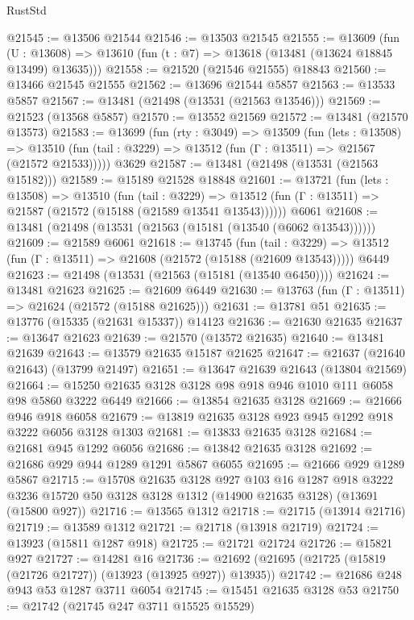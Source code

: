 \begin{lexlean}{RustStd}
\begin{coremodule}
@21545 := @13506 @21544
@21546 := @13503 @21545
@21555 := @13609
    (fun (U : @13608) => @13610 (fun (t : @7) => @13618 (@13481 (@13624 @18845 @13499) @13635)))
@21558 := @21520 (@21546 @21555) @18843
@21560 := @13466 @21545 @21555
@21562 := @13696 @21544 @5857
@21563 := @13533 @5857
@21567 := @13481 (@21498 (@13531 (@21563 @13546)))
@21569 := @21523 (@13568 @5857)
@21570 := @13552 @21569
@21572 := @13481 (@21570 @13573)
@21583 := @13699
    (fun (rty : @3049) =>
    @13509
      (fun (lets : @13508) =>
      @13510 (fun (tail : @3229) => @13512 (fun (Γ : @13511) => @21567 (@21572 @21533)))))
    @3629
@21587 := @13481 (@21498 (@13531 (@21563 @15182)))
@21589 := @15189 @21528 @18848
@21601 := @13721
    (fun (lets : @13508) =>
    @13510
      (fun (tail : @3229) =>
      @13512 (fun (Γ : @13511) => @21587 (@21572 (@15188 (@21589 @13541 @13543))))))
    @6061
@21608 := @13481 (@21498 (@13531 (@21563 (@15181 (@13540 (@6062 @13543))))))
@21609 := @21589 @6061
@21618 := @13745
    (fun (tail : @3229) => @13512 (fun (Γ : @13511) => @21608 (@21572 (@15188 (@21609 @13543)))))
    @6449
@21623 := @21498 (@13531 (@21563 (@15181 (@13540 @6450))))
@21624 := @13481 @21623
@21625 := @21609 @6449
@21630 := @13763 (fun (Γ : @13511) => @21624 (@21572 (@15188 @21625)))
@21631 := @13781 @51
@21635 := @13776 (@15335 (@21631 @15337)) @14123
@21636 := @21630 @21635
@21637 := @13647 @21623
@21639 := @21570 (@13572 @21635)
@21640 := @13481 @21639
@21643 := @13579 @21635 @15187 @21625
@21647 := @21637 (@21640 @21643) (@13799 @21497)
@21651 := @13647 @21639 @21643 (@13804 @21569)
@21664 := @15250 @21635 @3128 @3128 @98 @918 @946 @1010 @111 @6058 @98 @5860 @3222 @6449
@21666 := @13854 @21635 @3128
@21669 := @21666 @946 @918 @6058
@21679 := @13819 @21635 @3128 @923 @945 @1292 @918 @3222 @6056 @3128 @1303
@21681 := @13833 @21635 @3128
@21684 := @21681 @945 @1292 @6056
@21686 := @13842 @21635 @3128
@21692 := @21686 @929 @944 @1289 @1291 @5867 @6055
@21695 := @21666 @929 @1289 @5867
@21715 := @15708
    @21635
    @3128
    @927
    @103
    @16
    @1287
    @918
    @3222
    @3236
    @15720
    @50
    @3128
    @3128
    @1312
    (@14900 @21635 @3128)
    (@13691 (@15800 @927))
@21716 := @13565 @1312
@21718 := @21715 (@13914 @21716)
@21719 := @13589 @1312
@21721 := @21718 (@13918 @21719)
@21724 := @13923 (@15811 @1287 @918)
@21725 := @21721 @21724
@21726 := @15821 @927
@21727 := @14281 @16
@21736 := @21692 (@21695 (@21725 (@15819 (@21726 @21727)) (@13923 (@13925 @927)) @13935))
@21742 := @21686 @248 @943 @53 @1287 @3711 @6054
@21745 := @15451 @21635 @3128 @53
@21750 := @21742 (@21745 @247 @3711 @15525 @15529)

\end{coremodule}
\end{lexlean}
